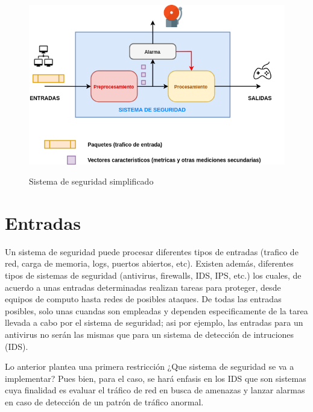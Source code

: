 \documentclass[12pt]{article}
\begin{document}
\begin{figure}[htbp]
\begin{center}
\includegraphics[scale=0.5]{sistema_simplificado2.png}\\[1cm] %
\caption{Sistema de seguridad simplificado}
\end{center}
\end{figure}

\section{Entradas}

Un sistema de seguridad puede procesar diferentes tipos de entradas (trafico de red, carga de memoria, logs, puertos abiertos, etc). Existen además, diferentes tipos de sistemas de seguridad (antivirus, firewalls, IDS, IPS, etc.) los cuales, de acuerdo a unas entradas determinadas realizan tareas para proteger, desde equipos de computo hasta redes de posibles ataques. De todas las entradas posibles, solo unas cuandas son empleadas y dependen especificamente de la tarea llevada a cabo por el sistema de seguridad; asi por ejemplo, las entradas para un antivirus no serán las mismas que para un sistema de detección de intruciones (IDS). 

Lo anterior plantea una primera restricción ¿Que sistema de seguridad se va a implementar? Pues bien, para el caso, se hará enfasis en los IDS que son sistemas
cuya finalidad es evaluar el tráfico de red en busca de amenazas y lanzar alarmas en caso de detección de un patrón de tráfico anormal.
\end{document}
